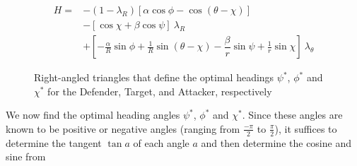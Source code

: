 \begin{equation*}
	\begin{split}
		H = & -(1-\lambda_R) [\alpha \cos \phi - \cos(\theta - \chi)]\\
		& - [\cos\chi + \beta \cos \psi ]\ \lambda_R \\
		& + [-\frac{\alpha}{R} \sin \phi + \frac{1}{R} \sin (\theta - \chi) - \dfrac{\beta}{r} \sin \psi + \frac{1}{r} \sin \chi ]\ \lambda_\theta 
	\end{split}
\end{equation*}

\begin{figure}[ht!]
	\centering
	\newcommand{\pythagwidth}{3cm}
	\newcommand{\pythagheight}{2cm}
\caption{Right-angled triangles that define the optimal headings $\psi^*$, $\phi^*$ and $\chi^*$ for the Defender, Target, and Attacker, respectively}
\label{optimal heading angles}
\end{figure}


We now find the optimal heading angles $\psi^*$, $\phi^*$ and $\chi^*$. Since these angles are known to be positive or negative angles (ranging from $\frac{-\pi}{2}$ to $\frac{\pi}{2}$), it suffices to determine the tangent $\tan a$ of each angle $a$ and then determine the cosine and sine from

